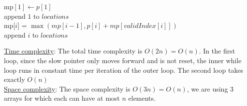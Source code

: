 \begin{customsolutionbox}
\begin{algorithm}[H]
{            

            \vspace{1em}

            mp$[1] \gets p[1]$ \\
            append $1$ to $locations$ \\
             {
                mp[$i$] = $\max(mp[i-1], p[i] + mp[validIndex[i]])$ \\
                 {
                    append $i$ to $locations$
                }
            }

        }
    \end{algorithm}

    \underline{Time complexity}: The total time complexity is $O(2n) = O(n)$. In the first loop, 
    since the slow pointer only moves forward and is not reset, the inner while loop runs in constant time per iteration of the outer loop. 
    The second loop takes exactly $O(n)$ \\
    \underline{Space complexity}: The space complexity is $O(3n) = O(n)$, we are using 3 arrays for which each 
    can have at most $n$ elements.
\end{customsolutionbox}